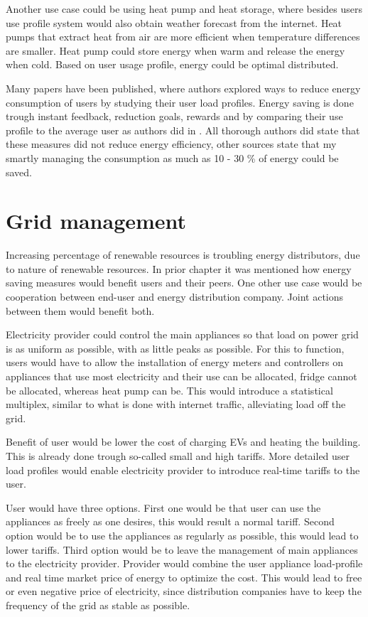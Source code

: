 \documentclass[
11pt, %
english, %
singlespacing, %
headsepline, %
]{MastersDoctoralThesis} %
\begin{document}
Another use case could be using heat pump and heat storage,
where besides users use profile system would also obtain weather forecast from the internet.
Heat pumps that extract heat from air are more efficient when temperature differences are smaller. 
Heat pump could store energy when warm and release the energy when cold.
Based on user usage profile, energy could be optimal distributed.

Many papers have been published, where authors explored ways to reduce energy consumption of users by studying their user load profiles.
Energy saving is done trough instant feedback, reduction goals, rewards and by comparing their use profile to the average user as authors did in \cite{Csoknyai2019}.
All thorough authors did state that these measures did not reduce energy efficiency, other sources state that my smartly managing the consumption 
as much as 10 - 30 \% of energy could be saved. 

\section{Grid management}

Increasing percentage of renewable resources is troubling energy distributors, due to nature of renewable resources.
In prior chapter it was mentioned how energy saving measures would benefit users and their peers.
One other use case would be cooperation between end-user and energy distribution company.
Joint actions between them would benefit both.

Electricity provider could control the main appliances so that load on power grid is as uniform as possible,
with as little peaks as possible. For this to function, users would have to allow the installation of energy meters and controllers 
on appliances that use most electricity and their use can be allocated, fridge cannot be allocated, whereas heat pump can be.
This would introduce a statistical multiplex, similar to what is done with internet traffic, alleviating load off the grid. 

Benefit of user would be lower the cost of charging EVs and heating the building.
This is already done trough so-called small and high tariffs.
More detailed user load profiles would enable electricity provider to introduce real-time tariffs to the user.

User would have three options. First one would be that user can use the appliances as freely as one desires, this would result a normal tariff.
Second option would be to use the appliances as regularly as possible, this would lead to lower tariffs.
Third option would be to leave the management of main appliances to the electricity provider.
Provider would combine the user appliance load-profile and real time market price of energy to optimize the cost. 
This would lead to free or even negative price of electricity, since distribution companies have to keep the frequency of the grid as stable as possible.
\end{document}
